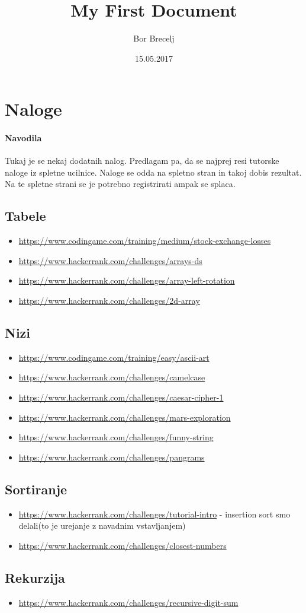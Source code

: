 \documentclass{article}
\title{My First Document}
\date{15.05.2017}
\author{Bor Brecelj}
\begin{document}
	
	\section{Naloge}
		\paragraph{Navodila} Tukaj je se nekaj dodatnih nalog. Predlagam pa, da se najprej resi tutorske naloge iz spletne ucilnice. Naloge se odda na spletno stran in takoj dobis rezultat. Na te spletne strani se je potrebno registrirati ampak se splaca.

		\subsection{Tabele}
			\begin{itemize}
				\item \url{https://www.codingame.com/training/medium/stock-exchange-losses}
				\item \url{https://www.hackerrank.com/challenges/arrays-ds}
				\item \url{https://www.hackerrank.com/challenges/array-left-rotation}
				\item \url{https://www.hackerrank.com/challenges/2d-array}
			\end{itemize}

		\subsection{Nizi}
			\begin{itemize}
				\item \url{https://www.codingame.com/training/easy/ascii-art}
				\item \url{https://www.hackerrank.com/challenges/camelcase}
				\item \url{https://www.hackerrank.com/challenges/caesar-cipher-1}
				\item \url{https://www.hackerrank.com/challenges/mars-exploration}
				\item \url{https://www.hackerrank.com/challenges/funny-string}
				\item \url{https://www.hackerrank.com/challenges/pangrams}
			\end{itemize}

		\subsection{Sortiranje}
			\begin{itemize}
				\item \url{https://www.hackerrank.com/challenges/tutorial-intro} - insertion sort smo delali(to je urejanje z navadnim vstavljanjem)
				\item \url{https://www.hackerrank.com/challenges/closest-numbers}
			\end{itemize}

		\subsection{Rekurzija}
			\begin{itemize}
				\item \url{https://www.hackerrank.com/challenges/recursive-digit-sum}
			\end{itemize}
\end{document}
